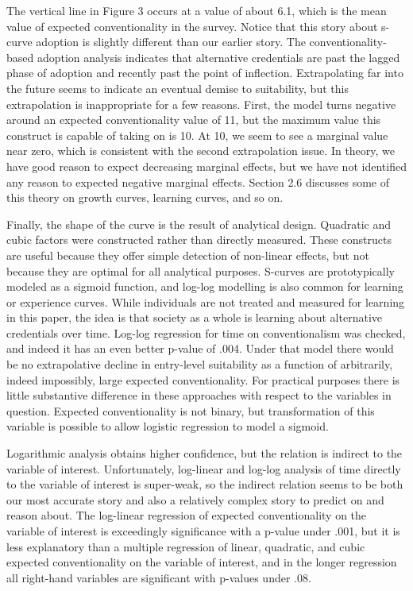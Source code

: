 \documentclass[AER]{/Users/zyl357/Documents/GitHub/research-dissertation-case-for-alt-ed/papers/alt-ed-survey/aea-latex-templates/AEA}
\begin{document}

The vertical line in Figure 3 occurs at a value of about 6.1, which is the
mean value of expected conventionality in the survey. Notice that this
story about s-curve adoption is slightly different than our earlier story.
The conventionality-based adoption analysis indicates that alternative
credentials are past the lagged phase of adoption and recently past the
point of inflection. Extrapolating far into the future seems to indicate
an eventual demise to suitability, but this extrapolation is inappropriate
for a few reasons. First, the model turns negative around an expected
conventionality value of 11, but the maximum value this construct is
capable of taking on is 10. At 10, we seem to see a marginal value near
zero, which is consistent with the second extrapolation issue. In theory,
we have good reason to expect decreasing marginal effects, but we have not
identified any reason to expected negative marginal effects. Section 2.6
discusses some of this theory on growth curves, learning curves, and so
on.

Finally, the shape of the curve is the result of analytical design.
Quadratic and cubic factors were constructed rather than directly
measured. These constructs are useful because they offer simple detection
of non-linear effects, but not because they are optimal for all analytical
purposes. S-curves are prototypically modeled as a sigmoid function, and
log-log modelling is also common for learning or experience curves. While
individuals are not treated and measured for learning in this paper, the
idea is that society as a whole is learning about alternative credentials
over time. Log-log regression for time on conventionalism was checked, and
indeed it has an even better p-value of .004. Under that model there would
be no extrapolative decline in entry-level suitability as a function of
arbitrarily, indeed impossibly, large expected conventionality. For
practical purposes there is little substantive difference in these
approaches with respect to the variables in question. Expected
conventionality is not binary, but transformation of this variable is
possible to allow logistic regression to model a sigmoid.

Logarithmic analysis obtains higher confidence, but the relation is
indirect to the variable of interest. Unfortunately, log-linear and
log-log analysis of time directly to the variable of interest is
super-weak, so the indirect relation seems to be both our most accurate
story and also a relatively complex story to predict on and reason about.
The log-linear regression of expected conventionality on the variable of
interest is exceedingly significance with a p-value under .001, but it is
less explanatory than a multiple regression of linear, quadratic, and
cubic expected conventionality on the variable of interest, and in the
longer regression all right-hand variables are significant with p-values
under .08.
\end{document}
